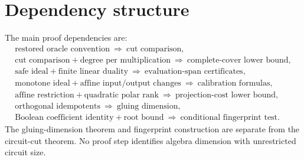 \section{Dependency structure}
The main proof dependencies are:
\[
\begin{gathered}
\text{restored oracle convention}\ \Longrightarrow\ \text{cut comparison},\\
\text{cut comparison}+\text{degree per multiplication}\
\Longrightarrow\ \text{complete-cover lower bound},\\
\text{safe ideal}+\text{finite linear duality}\
\Longrightarrow\ \text{evaluation-span certificates},\\
\text{monotone ideal}+\text{affine input/output changes}\
\Longrightarrow\ \text{calibration formulas},\\
\text{affine restriction}+\text{quadratic polar rank}\
\Longrightarrow\ \text{projection-cost lower bound},\\
\text{orthogonal idempotents}\ \Longrightarrow\ \text{gluing dimension},\\
\text{Boolean coefficient identity}+\text{root bound}\
\Longrightarrow\ \text{conditional fingerprint test}.
\end{gathered}
\]
The gluing-dimension theorem and fingerprint construction are separate from the circuit-cut theorem. No proof step identifies algebra dimension with unrestricted circuit size.

\clearpage
